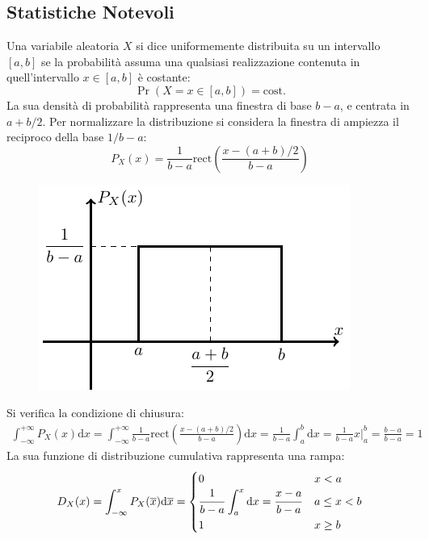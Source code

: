 \documentclass{article}
\newcommand{\rect}{\mathrm{rect}}
\newcommand{\df}{\mathrm{d}}
\newcommand{\intinf}{\displaystyle\int_{-\infty}^{+\infty}}
\numberwithin{equation}{subsection}
\begin{document}
\subsection{Statistiche Notevoli}
Una variabile aleatoria $X$ si dice uniformemente distribuita su un intervallo $[a,b]$ se la probabilità assuma una qualsiasi realizzazione contenuta 
in quell'intervallo $x\in[a,b]$ è costante:
\begin{equation}
    \Pr(X=x\in[a,b])=\mathrm{cost.}
\end{equation}
La sua densità di probabilità rappresenta una finestra di base $b-a$, e centrata in $a+b/2$. Per normalizzare la distribuzione si considera 
la finestra di ampiezza il reciproco della base $1/b-a$:
\begin{equation}
    P_X(x)=\displaystyle\frac{1}{b-a}\rect\left(\frac{x-(a+b)/2}{b-a}\right)
\end{equation}
\begin{figure}[H]%
    \centering
    \includegraphics{finestra-2.pdf}%
\end{figure}
Si verifica la condizione di chiusura:
\begin{gather*}
    \intinf P_X(x)\df x=\intinf\frac{1}{b-a}\rect\left(\frac{x-(a+b)/2}{b-a}\right)\df x=\frac{1}{b-a}\int_a^b\df x=\frac{1}{b-a}x\Bigg|^b_a=\frac{b-a}{b-a}=1
\end{gather*}
La sua funzione di distribuzione cumulativa rappresenta una rampa:
\begin{gather*}
    D_X(x)=\displaystyle\int_{-\infty}^xP_X(\overline{x})\df\overline{x}=
    \begin{cases}
        0 &x<a\\
        \displaystyle\frac{\strut1}{\strut b-a}\int_{a}^x\df x=\frac{\strut x-a}{\strut b-a} &a\leq x<b\\
        1 &x\geq b
    \end{cases}
\end{gather*}
\end{document}
